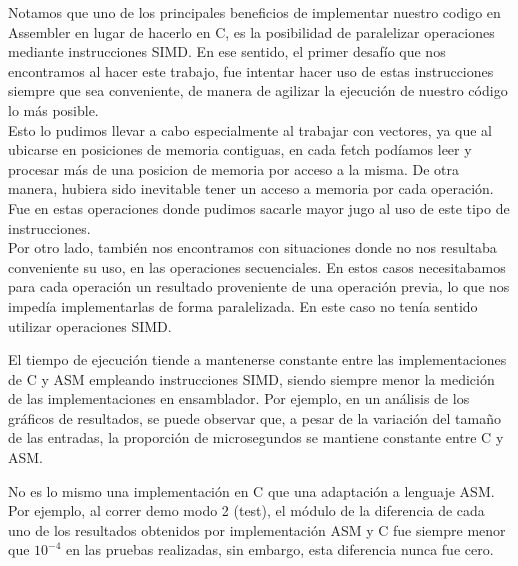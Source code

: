 \par 
Notamos que uno de los principales beneficios de implementar nuestro codigo en Assembler en lugar de hacerlo en C, es la posibilidad de paralelizar operaciones mediante instrucciones SIMD.
En ese sentido, el primer desafío que nos encontramos al hacer este trabajo, fue intentar hacer uso de estas instrucciones siempre que sea conveniente, de manera de agilizar la ejecución de nuestro código lo más posible.\\
Esto lo pudimos llevar a cabo especialmente al trabajar con vectores, ya que al ubicarse en posiciones de memoria contiguas, en cada fetch podíamos leer y procesar más de una posicion de memoria por acceso a la misma. De otra manera, hubiera sido inevitable tener un acceso a memoria por cada operación. Fue en estas operaciones donde pudimos sacarle mayor jugo al uso de este tipo de instrucciones.\\
Por otro lado, también nos encontramos con situaciones donde no nos resultaba conveniente su uso, en las operaciones secuenciales.
En estos casos necesitabamos para cada operación un resultado proveniente de una operación previa, lo que nos impedía implementarlas de forma paralelizada. En este caso no tenía sentido utilizar operaciones SIMD.\\


\par El tiempo de ejecución tiende a mantenerse constante entre las implementaciones de C y ASM empleando instrucciones SIMD, siendo siempre menor la medición de las implementaciones en ensamblador.
Por ejemplo, en un análisis de los gráficos de resultados, se puede observar que, a pesar de la variación del tamaño de las entradas, la proporción de microsegundos se mantiene constante entre C y ASM.\\

\par No es lo mismo una implementación en C que una adaptación a lenguaje ASM. Por ejemplo, al correr demo modo 2 (test), el módulo de la diferencia de cada uno de los resultados obtenidos por implementación ASM y C fue siempre menor que $10^{-4}$ en las pruebas realizadas, sin embargo, esta diferencia nunca fue cero.\\


